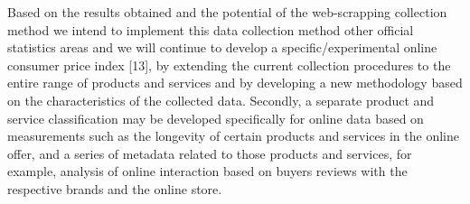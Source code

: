 \documentclass[]{article}
\begin{document}
Based on the results obtained and the potential of the web-scrapping collection method we intend to implement 
this data collection method other official statistics areas and we will continue to develop a specific/experimental online consumer price index [13], 
by extending the current collection procedures to the entire range of products and services and by 
developing a new methodology based on the characteristics of the collected data. Secondly, a separate product and service classification may 
be developed specifically for online data based on measurements such as the longevity of certain products 
and services in the online offer, and a series of metadata related to those products and services, for example, analysis of 
online interaction based on buyers reviews with the respective brands and the online store.
\end{document}
